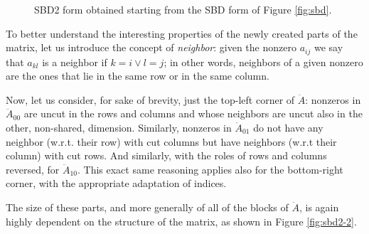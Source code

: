 \begin{figure}[h]
	\caption{SBD2 form obtained starting from the SBD form of Figure \ref{fig:sbd}.} \label{fig:sbd2}
\end{figure}

To better understand the interesting properties of the newly created parts of the matrix, let us introduce the concept of \emph{neighbor}: given the nonzero $a_{ij}$ we say that $a_{kl}$ is a neighbor if $k = i \vee l = j$; in other words, neighbors of a given nonzero are the ones that lie in the same row or in the same column.

Now, let us consider, for sake of brevity, just the top-left corner of $\ddot{A}$: nonzeros in $\ddot{A}_{00}$ are uncut in the rows and columns and whose neighbors are uncut also in the other, non-shared, dimension. Similarly, nonzeros in $\ddot{A}_{01}$ do not have any neighbor (w.r.t. their row) with cut columns but have neighbors (w.r.t their column) with cut rows. And similarly, with the roles of rows and columns reversed, for $\ddot{A}_{10}$. This exact same reasoning applies also for the bottom-right corner, with the appropriate adaptation of indices.

The size of these parts, and more generally of all of the blocks of $\ddot{A}$, is again highly dependent on the structure of the matrix, as shown in Figure \ref{fig:sbd2-2}.

